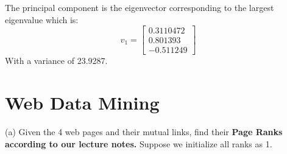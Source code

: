 \documentclass{article}
\begin{document}
The principal component is the eigenvector corresponding to the largest eigenvalue which is:
\begin{equation*}
    v_1 = 
    \begin{bmatrix}
        0.3110472 \\
        0.801393 \\
        -0.511249
    \end{bmatrix}
\end{equation*}
With a variance of 23.9287.


\section{Web Data Mining}

(a) Given the 4 web pages and their mutual links, find their \textbf{Page Ranks according to our lecture notes.} Suppose we initialize all ranks as 1.
\end{document}
